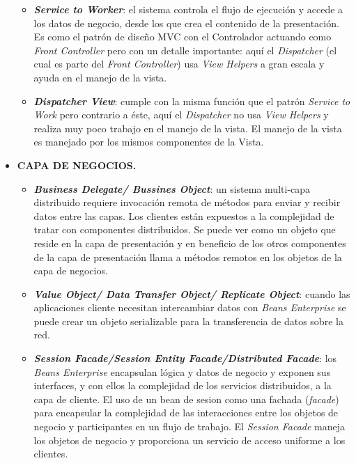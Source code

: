 \documentclass{memoria}
\begin{document}
\begin{itemize}
\begin{itemize}
\item \textbf{\textsl{Service to Worker}}: el sistema controla el flujo de ejecución y accede a los datos de negocio, desde los que crea el contenido de la presentación.
Es como el patrón de diseño MVC con el Controlador actuando como \textsl{Front Controller} pero con un detalle importante: aquí el \textsl{Dispatcher} (el cual es parte del \textsl{Front Controller}) usa \textsl{View Helpers} a gran escala y ayuda en el manejo de la vista.

\item \textbf{\textsl{Dispatcher View}}: cumple con la misma función que el patrón \textsl{Service to Work} pero contrario a éste, aquí el \textsl{Dispatcher} no usa \textsl{View Helpers} y realiza muy poco trabajo en el manejo de la vista. El manejo de la vista es manejado por los mismos componentes de la Vista.
\end{itemize}

\item \textbf{CAPA DE NEGOCIOS.}

\begin{itemize}
\item \textbf{\textsl{Business Delegate/ Bussines Object}}: un sistema multi-capa distribuido requiere invocación remota de métodos para enviar y recibir datos entre las capas. Los clientes están expuestos a la complejidad de tratar con componentes distribuidos. Se puede ver como un objeto que reside en la capa de presentación y en beneficio de los otros componentes de la capa de presentación llama a métodos remotos en los objetos de la capa de negocios.

\item \textbf{\textsl{Value Object/ Data Transfer Object/ Replicate Object}}: cuando las aplicaciones cliente necesitan intercambiar datos con \textsl{Beans Enterprise} se puede crear un objeto serializable para la transferencia de datos sobre la red.

\item \textbf{\textsl{Session Facade/Session Entity Facade/Distributed Facade}}: los \textsl{Beans Enterprise} encapsulan lógica y datos de negocio y exponen sus interfaces, y con ellos la complejidad de los servicios  distribuidos, a la capa de cliente. El uso de un bean de sesion como una fachada (\textsl{facade}) para encapsular la complejidad de las interacciones entre los objetos de negocio y participantes en un flujo de trabajo. El \textsl{Session Facade} maneja los objetos de negocio y proporciona un servicio de acceso uniforme a los clientes.


\end{itemize}
\end{itemize}
\end{document}
